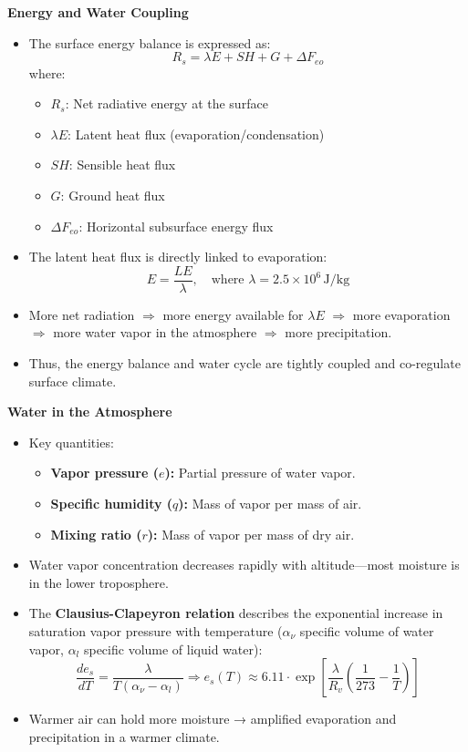 \documentclass[fontsize=8pt, a4paper, landscape, fleqn]{scrartcl}
\renewcommand{\subsection}[1]{%
    \noindent\colorbox{subsectioncolor}{%
        \parbox{\dimexpr\columnwidth-2\fboxsep}{\color{white}\textbf{#1}}}%
    \vspace{0.5mm}%
}
\begin{document}
\begin{multicols*}{3}[\raggedcolumns]
\subsection{Energy and Water Coupling}
\begin{itemize}
    \item The surface energy balance is expressed as:
    \[
    R_s = \lambda E + SH + G + \Delta F_{eo}
    \]
    where:
    \begin{itemize}
        \item $R_s$: Net radiative energy at the surface
        \item $\lambda E$: Latent heat flux (evaporation/condensation)
        \item $SH$: Sensible heat flux
        \item $G$: Ground heat flux
        \item $\Delta F_{eo}$: Horizontal subsurface energy flux
    \end{itemize}
    \item The latent heat flux is directly linked to evaporation:
    \[
    E = \frac{LE}{\lambda}, \quad \text{where } \lambda = 2.5 \times 10^6 \, \text{J/kg}
    \]
    \item More net radiation $\Rightarrow$ more energy available for $\lambda E$ $\Rightarrow$ more evaporation $\Rightarrow$ more water vapor in the atmosphere $\Rightarrow$ more precipitation.
    \item Thus, the energy balance and water cycle are tightly coupled and co-regulate surface climate.
\end{itemize}

\subsection{Water in the Atmosphere}
\begin{itemize}
    \item Key quantities:
    \begin{itemize}
        \item \textbf{Vapor pressure ($e$):} Partial pressure of water vapor.
        \item \textbf{Specific humidity ($q$):} Mass of vapor per mass of air.
        \item \textbf{Mixing ratio ($r$):} Mass of vapor per mass of dry air.
    \end{itemize}
    \item Water vapor concentration decreases rapidly with altitude—most moisture is in the lower troposphere.
    \item The \textbf{Clausius-Clapeyron relation} describes the exponential increase in saturation vapor pressure with temperature ($\alpha_\nu$ specific volume of water vapor, $\alpha_l$ specific volume of liquid water):
    \[
    \frac{de_s}{dT} = \frac{\lambda }{ T(\alpha_\nu -\alpha_l)}
    \Rightarrow e_s(T) \approx 6.11 \cdot \exp\left[\frac{\lambda}{R_v} \left(\frac{1}{273} - \frac{1}{T}\right)\right]
    \]
    \item Warmer air can hold more moisture → amplified evaporation and precipitation in a warmer climate.
\end{itemize}


\end{multicols*}
\end{document}
